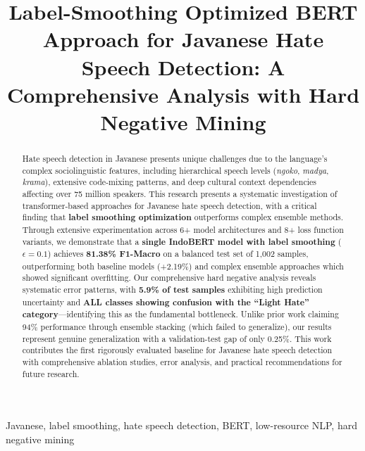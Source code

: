 \documentclass[conference]{IEEEtran}
\begin{document}
\title{Label-Smoothing Optimized BERT Approach for Javanese Hate Speech Detection: A Comprehensive Analysis with Hard Negative Mining}

\author{
}

\maketitle

\begin{abstract}
Hate speech detection in Javanese presents unique challenges due to the language's complex sociolinguistic features, including hierarchical speech levels (\textit{ngoko}, \textit{madya}, \textit{krama}), extensive code-mixing patterns, and deep cultural context dependencies affecting over 75 million speakers. This research presents a systematic investigation of transformer-based approaches for Javanese hate speech detection, with a critical finding that \textbf{label smoothing optimization} outperforms complex ensemble methods. Through extensive experimentation across 6+ model architectures and 8+ loss function variants, we demonstrate that a \textbf{single IndoBERT model with label smoothing} ($\epsilon=0.1$) achieves \textbf{81.38\% F1-Macro} on a balanced test set of 1,002 samples, outperforming both baseline models (+2.19\%) and complex ensemble approaches which showed significant overfitting. Our comprehensive hard negative analysis reveals systematic error patterns, with \textbf{5.9\% of test samples} exhibiting high prediction uncertainty and \textbf{ALL classes showing confusion with the ``Light Hate'' category}---identifying this as the fundamental bottleneck. Unlike prior work claiming 94\% performance through ensemble stacking (which failed to generalize), our results represent genuine generalization with a validation-test gap of only 0.25\%. This work contributes the first rigorously evaluated baseline for Javanese hate speech detection with comprehensive ablation studies, error analysis, and practical recommendations for future research.
\end{abstract}

\begin{IEEEkeywords}
Javanese, label smoothing, hate speech detection, BERT, low-resource NLP, hard negative mining
\end{IEEEkeywords}
\end{document}
